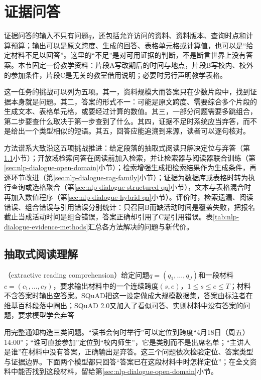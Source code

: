 \section{证据问答}
\label{sec:nlp-dialogue-evidence}

证据问答的输入不只有问题$q$，还包括允许访问的资料、资料版本、查询时点和计算预算；输出可以是原文跨度、生成的回答、表格单元格或计算值，也可以是“给定材料不足以回答”。这里的“不足”是对可用证据的判断，不是断言世界上没有答案。本节固定一份教学资料：片段A写改期后的时间与地点，片段B写校内、校外的参加条件，片段C是无关的教室借用说明；必要时另行声明教学表格。

这一任务的挑战可以列为五项。其一，资料规模大而答案只在少数片段中，找到证据本身就是问题。其二，答案的形式不一：可能是原文跨度、需要综合多个片段的生成文本、表格单元格，或要经过计算的数值。其三，一部分问题需要多跳组合，第二步要查什么取决于第一步查到了什么。其四，证据不足时系统应当弃答，而不是给出一个类型相似的短语。其五，回答应能追溯到来源，读者可以逐句核对。

方法谱系大致沿这五项挑战推进：给定段落的抽取式阅读只解决定位与弃答（第\ref{sec:nlp-dialogue-text-qa}小节）；开放域检索问答在阅读前加入检索，并让检索器与阅读器联合训练（第\ref{sec:nlp-dialogue-open-domain}小节）；检索增强生成把检索结果作为生成条件，再逐环节改进（第\ref{sec:nlp-dialogue-rag-family}小节）；证据为数据库或表格时转为执行查询或选格聚合（第\ref{sec:nlp-dialogue-structured-qa}小节），文本与表格混合时再加入数值程序（第\ref{sec:nlp-dialogue-hybrid-qa}小节）。评价时，检索遗漏、阅读错误、组合错误与引用错误分别统计：只召回B而缺活动时间是覆盖失败，把报名截止当成活动时间是组合错误，答案正确却引用了C是引用错误。表\ref{tab:nlp-dialogue-evidence-methods}汇总各方法解决的问题与新代价。

\subsection{抽取式阅读理解}
\label{sec:nlp-dialogue-text-qa}

（extractive reading comprehension）给定问题$q=(q_1,\ldots,q_J)$和一段材料$c=(c_1,\ldots,c_T)$，要求输出材料中的一个连续跨度$(s,e)$，$1\leq s\leq e\leq T$；材料不含答案时输出空答案。SQuAD把这一设定做成大规模数据集，答案由标注者在维基百科段落中圈出；SQuAD 2.0又加入了看似可答、实则材料中没有答案的问题，要求模型学会弃答

用完整通知构造三类问题。“读书会何时举行”可以定位到跨度“4月18日（周五）14:00”；“谁可直接参加”定位到“校内师生”，它是类别而不是出席名单；“主讲人是谁”在材料中没有答案，正确输出是弃答。这三个问题依次检验定位、答案类型与证据边界。下面两个模型都只回答“答案已在这段材料中时怎样定位”；在全文资料中能否找到这段材料，留给第\ref{sec:nlp-dialogue-open-domain}小节。


